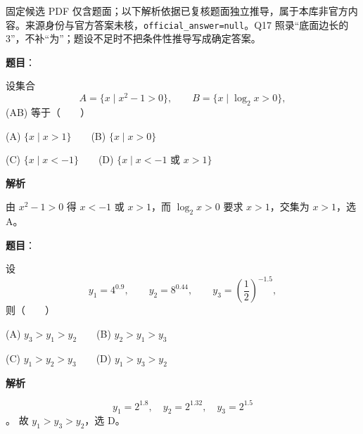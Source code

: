 

\begin{gktip}
固定候选 PDF 仅含题面；以下解析依据已复核题面独立推导，属于本库非官方内容。来源身份与官方答案未核，\texttt{official_answer=null}。Q17 照录“底面边长的 3”，不补“为”；题设不足时不把条件性推导写成确定答案。
\end{gktip}


\begin{answer}

\textbf{题目}：

设集合
\nopagebreak[4]
\[
   A=\{x\mid x^2-1>0\},\qquad B=\{x\mid \log_2x>0\},
\]
   (A\cap B) 等于\mbox{（　　）}

   (A) \(\{x\mid x>1\}\)　　(B) \(\{x\mid x>0\}\)

   (C) \(\{x\mid x<-1\}\)　　(D) \(\{x\mid x<-1\text{ 或 }x>1\}\)

\textbf{解析}

由 \(x^2-1>0\) 得 \(x<-1\) 或 \(x>1\)，而 \(\log_2x>0\) 要求 \(x>1\)，交集为 \(x>1\)，选 A。


\end{answer}
\begin{answer}

\textbf{题目}：

设
\nopagebreak[4]
\[
   y_1=4^{0.9},\qquad y_2=8^{0.44},\qquad y_3=\left(\frac12\right)^{-1.5},
\]
   则\mbox{（　　）}

   (A) \(y_3>y_1>y_2\)　　(B) \(y_2>y_1>y_3\)

   (C) \(y_1>y_2>y_3\)　　(D) \(y_1>y_3>y_2\)

\textbf{解析}

\nopagebreak[4]
\[
y_1=2^{1.8},\quad y_2=2^{1.32},\quad y_3=2^{1.5}
\]
。
故 \(y_1>y_3>y_2\)，选 D。


\end{answer}
